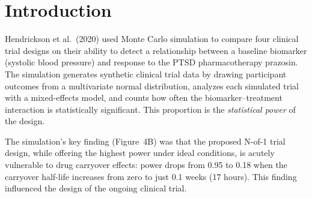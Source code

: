 \documentclass[11pt]{article}
\begin{document}
\maketitle
\thispagestyle{fancy}

\begin{abstract}
The simulation framework described in Hendrickson et al.\
(2020) compares statistical power across four clinical trial
designs for detecting a biomarker--treatment interaction. A
detailed audit of the simulation code identified two problems
that affect the published power estimates: (1)~the dramatic
power loss attributed to drug carryover (Figure~4B) is
primarily a modeling artifact rather than a genuine
statistical consequence, and (2)~the covariance matrix used
to generate simulated data is mathematically invalid for a
substantial fraction of the parameter space, requiring silent
correction that alters the intended data structure. This
document explains both problems in clinical terms, describes
the corrections, and presents validated results showing that
the paper's qualitative conclusions are preserved while the
quantitative estimates are refined.
\end{abstract}

\tableofcontents
\newpage

\section{Introduction}

Hendrickson et al.\ (2020) used Monte Carlo simulation to
compare four clinical trial designs on their ability to detect
a relationship between a baseline biomarker (systolic blood
pressure) and response to the PTSD pharmacotherapy prazosin.
The simulation generates synthetic clinical trial data by
drawing participant outcomes from a multivariate normal
distribution, analyzes each simulated trial with a mixed-effects
model, and counts how often the biomarker--treatment interaction
is statistically significant. This proportion is the
\emph{statistical power} of the design.

The simulation's key finding (Figure~4B) was that the proposed
N-of-1 trial design, while offering the highest power under
ideal conditions, is acutely vulnerable to drug carryover
effects: power drops from 0.95 to 0.18 when the carryover
half-life increases from zero to just 0.1 weeks (17 hours).
This finding influenced the design of the ongoing clinical
trial.
\end{document}
